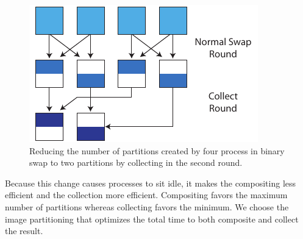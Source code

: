 \documentclass{sig-alternate}
\begin{document}
\begin{figure}[htbp]
  \centering
  \includegraphics[scale=.9]{images/CollectRounds}
  \caption{Reducing the number of partitions created by four process in
    binary swap to two partitions by collecting in the second round.}
  \label{fig:CollectRounds}
\end{figure}

Because this change causes processes to sit idle, it makes the compositing
less efficient and the collection more efficient.  Compositing favors the
maximum number of partitions whereas collecting favors the minimum.  We
choose the image partitioning that optimizes the total time to both
composite and collect the result.

\end{document}
